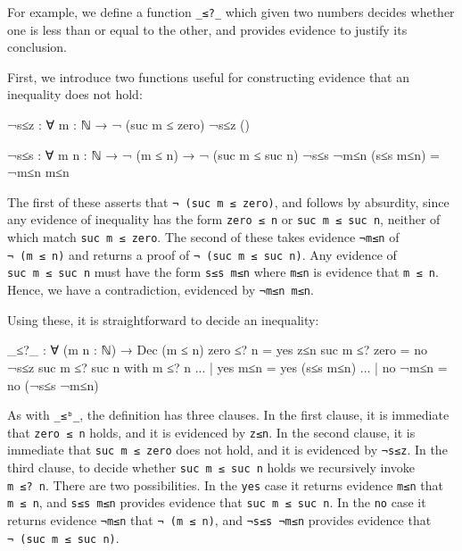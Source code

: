 For example, we define a function \texttt{\_≤?\_} which given two
numbers decides whether one is less than or equal to the other, and
provides evidence to justify its conclusion.

First, we introduce two functions useful for constructing evidence that
an inequality does not hold:

\begin{fence}
\begin{code}
¬s≤z : ∀ {m : ℕ} → ¬ (suc m ≤ zero)
¬s≤z ()

¬s≤s : ∀ {m n : ℕ} → ¬ (m ≤ n) → ¬ (suc m ≤ suc n)
¬s≤s ¬m≤n (s≤s m≤n) = ¬m≤n m≤n
\end{code}
\end{fence}

The first of these asserts that \texttt{¬\ (suc\ m\ ≤\ zero)}, and
follows by absurdity, since any evidence of inequality has the form
\texttt{zero\ ≤\ n} or \texttt{suc\ m\ ≤\ suc\ n}, neither of which
match \texttt{suc\ m\ ≤\ zero}. The second of these takes evidence
\texttt{¬m≤n} of \texttt{¬\ (m\ ≤\ n)} and returns a proof of
\texttt{¬\ (suc\ m\ ≤\ suc\ n)}. Any evidence of
\texttt{suc\ m\ ≤\ suc\ n} must have the form \texttt{s≤s\ m≤n} where
\texttt{m≤n} is evidence that \texttt{m\ ≤\ n}. Hence, we have a
contradiction, evidenced by \texttt{¬m≤n\ m≤n}.

Using these, it is straightforward to decide an inequality:

\begin{fence}
\begin{code}
_≤?_ : ∀ (m n : ℕ) → Dec (m ≤ n)
zero  ≤? n                   =  yes z≤n
suc m ≤? zero                =  no ¬s≤z
suc m ≤? suc n with m ≤? n
...               | yes m≤n  =  yes (s≤s m≤n)
...               | no ¬m≤n  =  no (¬s≤s ¬m≤n)
\end{code}
\end{fence}

As with \texttt{\_≤ᵇ\_}, the definition has three clauses. In the first
clause, it is immediate that \texttt{zero\ ≤\ n} holds, and it is
evidenced by \texttt{z≤n}. In the second clause, it is immediate that
\texttt{suc\ m\ ≤\ zero} does not hold, and it is evidenced by
\texttt{¬s≤z}. In the third clause, to decide whether
\texttt{suc\ m\ ≤\ suc\ n} holds we recursively invoke
\texttt{m\ ≤?\ n}. There are two possibilities. In the \texttt{yes} case
it returns evidence \texttt{m≤n} that \texttt{m\ ≤\ n}, and
\texttt{s≤s\ m≤n} provides evidence that \texttt{suc\ m\ ≤\ suc\ n}. In
the \texttt{no} case it returns evidence \texttt{¬m≤n} that
\texttt{¬\ (m\ ≤\ n)}, and \texttt{¬s≤s\ ¬m≤n} provides evidence that
\texttt{¬\ (suc\ m\ ≤\ suc\ n)}.

